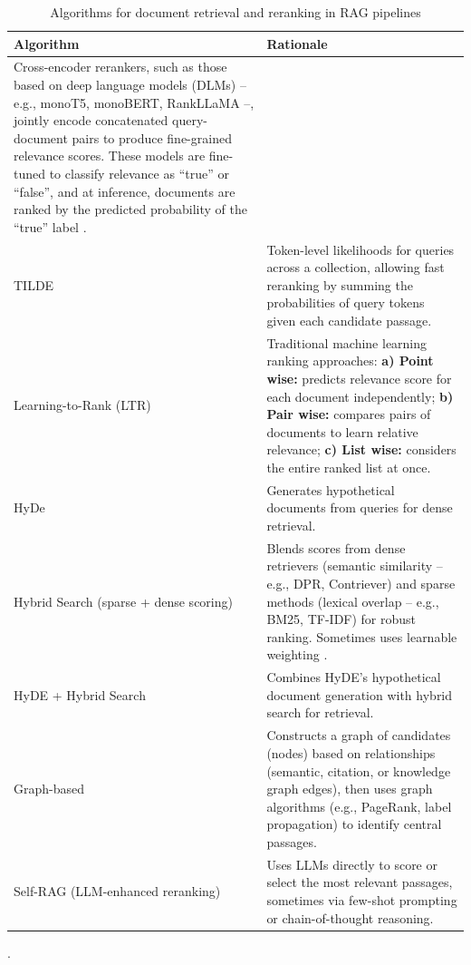 \begin{spacing}{1.5}
\addtocounter{table}{-1}
\begin{table}[H]
\centering
\footnotesize
\begin{tabularx}{\textwidth}{l X}
\toprule
\textbf{Algorithm} & \textbf{Rationale} \\
\midrule
Cross-encoder rerankers, such as those based on deep language models (DLMs) -- e.g., monoT5, monoBERT, RankLLaMA --, jointly encode concatenated query-document pairs to produce fine-grained relevance scores. These models are fine-tuned to classify relevance as ``true'' or ``false'', and at inference, documents are ranked by the predicted probability of the ``true'' label \citep{wang_searching_2024}. \\
\cmidrule(lr){1-2}
TILDE \citep{zhuang_tilde_2021} & Token-level likelihoods for queries across a collection, allowing fast reranking by summing the probabilities of query tokens given each candidate passage. \\
\cmidrule(lr){1-2}
Learning-to-Rank (LTR) \citep{gupta_comprehensive_2024} & Traditional machine learning ranking approaches: \textbf{a) Point wise:} predicts relevance score for each document independently; \textbf{b) Pair wise:} compares pairs of documents to learn relative relevance; \textbf{c) List wise:} considers the entire ranked list at once.\\
\cmidrule(lr){1-2}
HyDe \citep{gao_precise_2022}  & Generates hypothetical documents from queries for dense retrieval.\\
\cmidrule(lr){1-2}
Hybrid Search (sparse + dense scoring) & Blends scores from dense retrievers (semantic similarity -- e.g., DPR, Contriever) and sparse methods (lexical overlap -- e.g., BM25, TF-IDF) for robust ranking. Sometimes uses learnable weighting \citep{wang_searching_2024}. \\
\cmidrule(lr){1-2}
HyDE + Hybrid Search \citep{wang_searching_2024} & Combines HyDE's hypothetical document generation with hybrid search for retrieval. \\
\cmidrule(lr){1-2}
Graph-based \citep{han_retrieval-augmented_2025} & Constructs a graph of candidates (nodes) based on relationships (semantic, citation, or knowledge graph edges), then uses graph algorithms  (e.g., PageRank, label propagation) to identify central passages. \\
\cmidrule(lr){1-2}
Self-RAG (LLM-enhanced reranking) \citep{asai_self-rag_2023} & Uses LLMs directly to score or select the most relevant passages, sometimes via few-shot prompting or chain-of-thought reasoning. \\
\bottomrule
\end{tabularx}
\vspace{0.5em}
\caption{Algorithms for document retrieval and reranking in RAG pipelines}.
\label{tab:rerank_algorithms}
\end{table}




\end{spacing}
